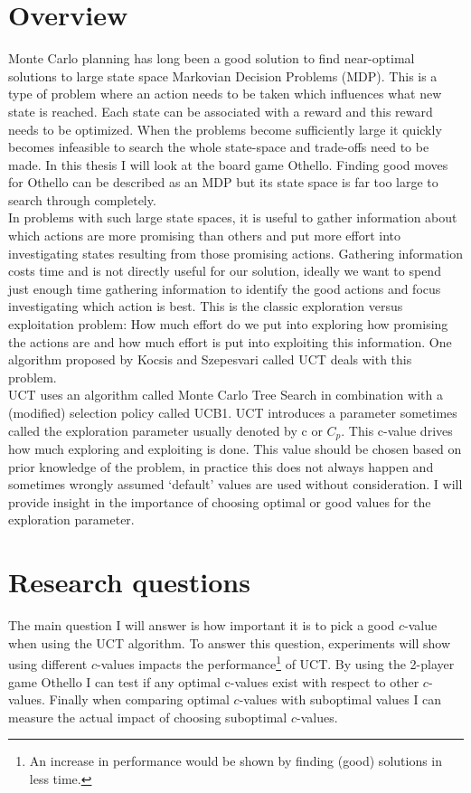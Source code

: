 \documentclass[
11pt, %
english, %
singlespacing, %
headsepline, %
]{MastersDoctoralThesis} %
\begin{document}
\section{Overview}
Monte Carlo planning has long been a good solution to find near-optimal solutions to large state space Markovian Decision Problems (MDP). This is a type of problem where an action needs to be taken which influences what new state is reached. Each state can be associated with a reward and this reward needs to be optimized. When the problems become sufficiently large it quickly becomes infeasible to search the whole state-space and trade-offs need to be made. In this thesis I will look at the board game Othello. Finding good moves for Othello can be described as an MDP but its state space is far too large to search through completely.\\

In problems with such large state spaces, it is useful to gather information about which actions are more promising than others and put more effort into investigating states resulting from those promising actions. Gathering information costs time and is not directly useful for our solution, ideally we want to spend just enough time gathering information to identify the good actions and focus investigating which action is best. This is the classic exploration versus exploitation problem: How much effort do we put into exploring how promising the actions are and how much effort is put into exploiting this information. One algorithm proposed by Kocsis and Szepesvari\cite{Kocsis:2006} called UCT deals with this problem.\\

UCT uses an algorithm called Monte Carlo Tree Search in combination with a (modified) selection policy called UCB1. UCT introduces a parameter sometimes called the exploration parameter usually denoted by c or $C_p$. This c-value drives how much exploring and exploiting is done. This value should be chosen based on prior knowledge of the problem, in practice this does not always happen and sometimes wrongly assumed `default' values are used without consideration. I will provide insight in the importance of choosing optimal or good values for the exploration parameter.
\vfill
\pagebreak
\section{Research questions}
\label{section:research-questions}
The main question I will answer is how important it is to pick a good $c$-value when using the UCT algorithm. To answer this question, experiments will show using different $c$-values impacts the performance\footnote{An increase in performance would be shown by finding (good) solutions in less time.} of UCT. By using the 2-player game Othello I can test if any optimal c-values exist with respect to other $c$-values. Finally when comparing optimal $c$-values with suboptimal values I can measure the actual impact of choosing suboptimal $c$-values.\\
\end{document}

